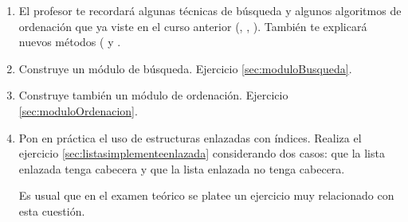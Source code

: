 \begin{enumerate}%

\item El profesor te recordará algunas técnicas de búsqueda  y algunos algoritmos de ordenación que ya viste en el curso anterior (, , ). También te explicará nuevos métodos ( y .

\item Construye un módulo de búsqueda. Ejercicio \ref{sec:moduloBusqueda}.


\item Construye también un  módulo de ordenación. Ejercicio \ref{sec:moduloOrdenacion}.




\item Pon en práctica el uso de estructuras enlazadas con índices. Realiza el ejercicio \ref{sec:listasimplementeenlazada} considerando dos casos: que la lista enlazada tenga cabecera y que la lista enlazada no tenga cabecera.

Es usual que en el examen teórico se platee un ejercicio muy relacionado con esta cuestión.

\end{enumerate}









